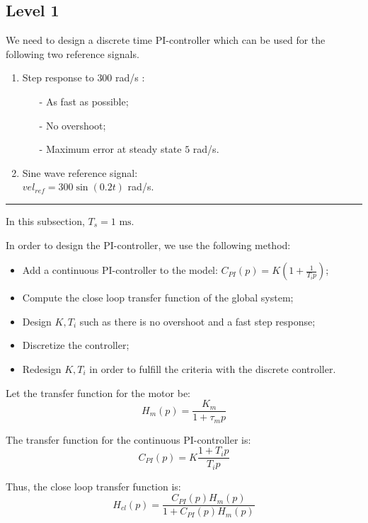 
\subsection*{Level 1}

We need to design a discrete time PI-controller which can be used for the following two reference signals.

\begin{enumerate}
 \item Step response to $300$ rad/s :
 \begin{itemize}
  \item[-] As fast as possible;
  \item[-] No overshoot;
  \item[-] Maximum error at steady state $5$ rad/s.
 \end{itemize}
  \item Sine wave reference signal: \\ $vel_{ref} = 300 \sin(0.2t)$ rad/s.
\end{enumerate}

\begin{center} \noindent\rule{6cm}{0.1pt} \end{center}

In this subsection, $T_s = 1 \text{ ms}$.

In order to design the PI-controller, we use the following method:
\begin{itemize}
 \item Add a continuous PI-controller to the model: $C_{PI}(p) = K(1 + \frac{1}{T_i p})$;
 \item Compute the close loop transfer function of the global system;
 \item Design $K,T_i$ such as there is no overshoot and a fast step response;
 \item Discretize the controller;
 \item Redesign $K,T_i$ in order to fulfill the criteria with the discrete controller.
\end{itemize}

Let the transfer function for the motor be: $$H_{m}(p) = \frac{K_{m}}{1 + \tau_{m} p}$$

The transfer function for the continuous PI-controller is: $$C_{PI}(p) = K\frac{1 + T_i p}{T_i p}$$

Thus, the close loop transfer function is: \begin{equation} \label{eq1} H_{cl}(p) = \frac{C_{PI}(p) H_{m}(p)}{1 + C_{PI}(p) H_{m}(p)} \end{equation}

